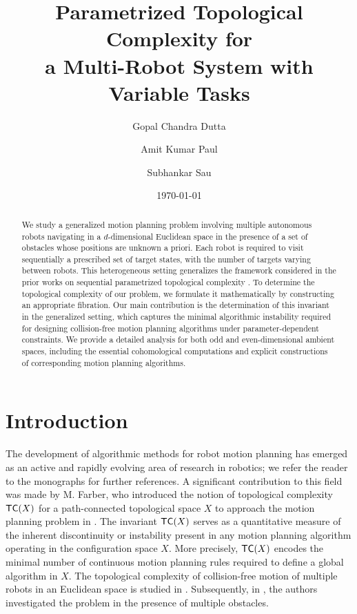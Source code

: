 \documentclass[12pt,oneside,reqno]{amsart}
\title[Parametrized Topological Complexity for Multi-Robot System]{Parametrized Topological Complexity for\\a Multi-Robot System with Variable Tasks}
\author{Gopal Chandra Dutta}
\author{Amit Kumar Paul}
\author{Subhankar Sau}
\date{\today}
\theoremstyle{plain}
\theoremstyle{definition}
\theoremstyle{remark}
\newcommand{\sect}{\setcounter{figure}{0}\section}
\newcommand{\TC}{{\sf {TC}}}
\begin{document}
\begin{abstract}
We study a generalized motion planning problem involving multiple autonomous robots navigating in a $d$-dimensional Euclidean space in the presence of a set of obstacles whose positions are unknown a priori. Each robot is required to visit sequentially a prescribed set of target states, with the number of targets varying between robots. This heterogeneous setting generalizes the framework considered in the prior works on sequential parametrized topological complexity \cite{FarP22, FarP23}. To determine the topological complexity of our problem, we formulate it mathematically by constructing an appropriate fibration.  
Our main contribution is the determination of this invariant in the generalized setting, which captures the minimal algorithmic instability required for designing collision-free motion planning algorithms under parameter-dependent constraints. We provide a detailed analysis for both odd and even-dimensional ambient spaces, including the essential cohomological computations and explicit constructions of corresponding motion planning algorithms.
\end{abstract}



\maketitle
\tableofcontents




\sect{Introduction}
The development of algorithmic methods for robot motion planning has emerged as an active and rapidly evolving area of research in robotics; we refer the reader to the monographs \cite{Lat91, LaV06} for further references. A significant contribution to this field was made by M. Farber, who introduced the notion of topological complexity $\TC(X)$ for a path-connected topological space $X$ to approach the motion planning problem in \cite{Far03}. The invariant $\TC(X)$ serves as a quantitative measure of the inherent discontinuity or instability present in any motion planning algorithm operating in the configuration space $X$. More precisely, $\TC(X)$ encodes the minimal number of continuous motion planning rules required to define a global algorithm in $X$.
The topological complexity of collision-free motion of multiple robots in an Euclidean space is studied in \cite{FarY04, FarG09}. Subsequently, in \cite{FarGY07}, the authors investigated the problem in the presence of multiple obstacles.
\end{document}
